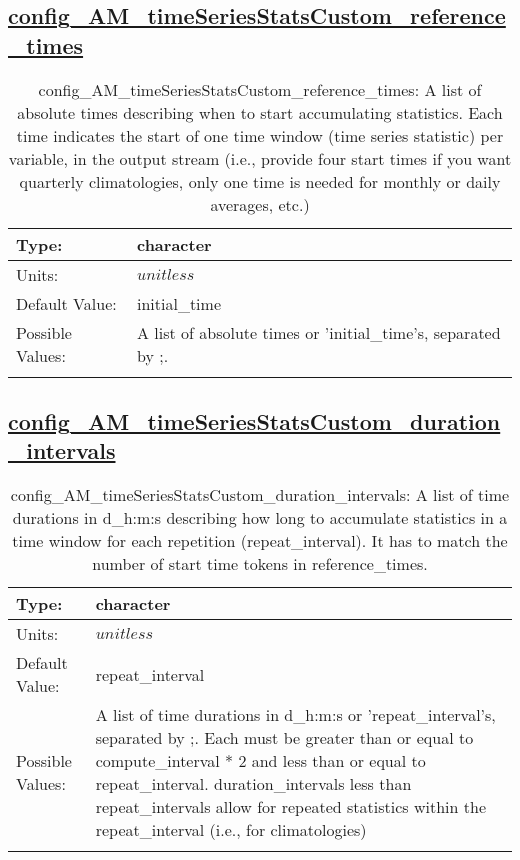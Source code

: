 \subsection[config\_AM\_timeSeriesStatsCustom\_reference\_times]{\hyperref[sec:nm_tab_AM_timeSeriesStatsCustom]{config\_AM\_timeSeriesStatsCustom\_reference\_times}}
\label{subsec:nm_sec_config_AM_timeSeriesStatsCustom_reference_times}
\begin{center}
\begin{longtable}{| p{2.0in} || p{4.0in} |}
    \hline
    Type: & character \\
    \hline
    Units: & $unitless$ \\
    \hline
    Default Value: & initial\_time \\
    \hline
    Possible Values: & A list of absolute times or 'initial\_time's, separated by ;. \\
    \hline
    \caption{config\_AM\_timeSeriesStatsCustom\_reference\_times: A list of absolute times describing when to start accumulating statistics. Each time indicates the start of one time window (time series statistic) per variable, in the output stream (i.e., provide four start times if you want quarterly climatologies, only one time is needed for monthly or daily averages, etc.)}
\end{longtable}
\end{center}
\subsection[config\_AM\_timeSeriesStatsCustom\_duration\_intervals]{\hyperref[sec:nm_tab_AM_timeSeriesStatsCustom]{config\_AM\_timeSeriesStatsCustom\_duration\_intervals}}
\label{subsec:nm_sec_config_AM_timeSeriesStatsCustom_duration_intervals}
\begin{center}
\begin{longtable}{| p{2.0in} || p{4.0in} |}
    \hline
    Type: & character \\
    \hline
    Units: & $unitless$ \\
    \hline
    Default Value: & repeat\_interval \\
    \hline
    Possible Values: & A list of time durations in d\_h:m:s or 'repeat\_interval's, separated by ;. Each must be greater than or equal to compute\_interval * 2 and less than or equal to repeat\_interval. duration\_intervals less than repeat\_intervals allow for repeated statistics within the repeat\_interval (i.e., for climatologies) \\
    \hline
    \caption{config\_AM\_timeSeriesStatsCustom\_duration\_intervals: A list of time durations in d\_h:m:s describing how long to accumulate statistics in a time window for each repetition (repeat\_interval). It has to match the number of start time tokens in reference\_times.}
\end{longtable}
\end{center}
